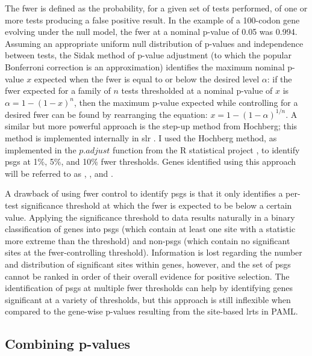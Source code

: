 The \ac{fwer} is defined as the probability, for a given set of tests
performed, of one or more tests producing a false positive result. In
the example of a 100-codon gene evolving under the null model, the
\ac{fwer} at a nominal p-value of 0.05 was 0.994. Assuming an
appropriate uniform null distribution of p-values and independence
between tests, the Sidak method of p-value adjustment (to which the
popular Bonferroni correction is an approximation) identifies the
maximum nominal p-value $x$ expected when the \ac{fwer} is equal to or
below the desired level $\alpha$: if the \ac{fwer} expected for a
family of $n$ tests thresholded at a nominal p-value of $x$ is
$\alpha=1 - (1 - x)^{n}$, then the maximum p-value expected while
controlling for a desired \ac{fwer} can be found by rearranging the
equation: $x=1 - (1 - \alpha)^{1/n}$. A similar but more powerful
approach is the step-up method from Hochberg; this method is
implemented internally in \ac{slr}
\citep{Hochberg1988,Massingham2005}. I used the Hochberg method, as
implemented in the $p.adjust$ function from the R statistical project
\citep{TODO}, to identify \acp{psg} at 1\%, 5\%, and 10\% \ac{fwer}
thresholds. Genes identified using this approach will be referred to
as \psghone, \psghfive, and \psghten.

A drawback of using \ac{fwer} control to identify \acp{psg} is that it
only identifies a \mbox{per-test} significance threshold at which the
\ac{fwer} is expected to be below a certain value. Applying the
significance threshold to \sw data results naturally in a binary
classification of genes into \acp{psg} (which contain at least one
site with a statistic more extreme than the threshold) and
non-\acp{psg} (which contain no significant sites at the
\ac{fwer}-controlling threshold). Information is lost regarding the
number and distribution of significant sites within genes, however,
and the set of \acp{psg} cannot be ranked in order of their overall
evidence for positive selection. The identification of \acp{psg} at
multiple \ac{fwer} thresholds can help by identifying genes
significant at a variety of thresholds, but this approach is still
inflexible when compared to the gene-wise p-values resulting from the
site-based \acp{lrt} in PAML.

\subsection{Combining p-values}

